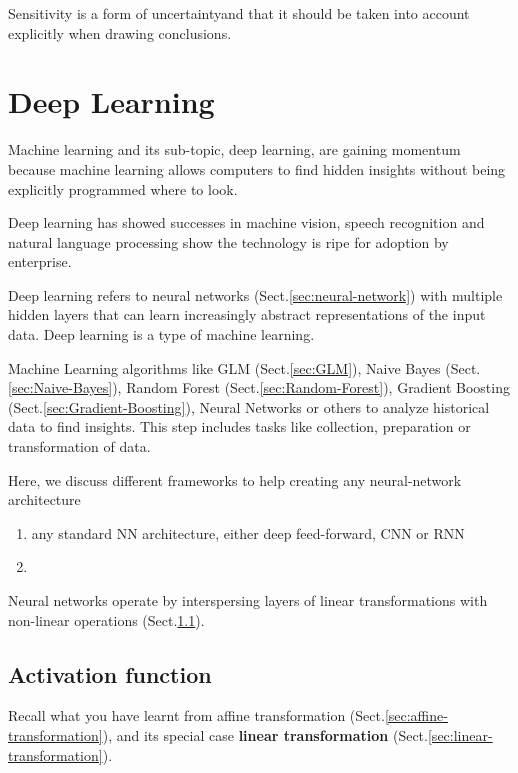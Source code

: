 Sensitivity is a form of uncertaintyand that it should be taken into
account explicitly when drawing conclusions.




\chapter{Deep Learning}
\label{chap:deep-learning}


Machine learning and its sub-topic, deep learning, are gaining momentum because
machine learning allows computers to find hidden insights without being
explicitly programmed where to look.

Deep learning has showed successes in machine vision, speech recognition and
natural language processing show the technology is ripe for adoption by enterprise.

Deep learning refers to neural networks (Sect.\ref{sec:neural-network}) with
multiple hidden layers that can learn increasingly abstract representations of
the input data. Deep learning is a type of machine learning.

Machine Learning algorithms like GLM (Sect.\ref{sec:GLM}), Naive Bayes
(Sect.\ref{sec:Naive-Bayes}), Random Forest (Sect.\ref{sec:Random-Forest}),
Gradient Boosting (Sect.\ref{sec:Gradient-Boosting}), Neural Networks or others
to analyze historical data to find insights.
This step includes tasks like collection, preparation or transformation of data. 

Here, we discuss different frameworks to help creating 
any neural-network architecture
\begin{enumerate}
  \item  any standard NN architecture, either deep feed-forward, CNN or RNN
    
  \item  
\end{enumerate}


Neural networks operate by interspersing layers of linear transformations with
non-linear operations (Sect.\ref{sec:activation-function-nonlinearity}).


\section{Activation function}
\label{sec:activation-function-nonlinearity}	

Recall what you have learnt from affine transformation
(Sect.\ref{sec:affine-transformation}), and its special case {\bf linear
transformation} (Sect.\ref{sec:linear-transformation}).

